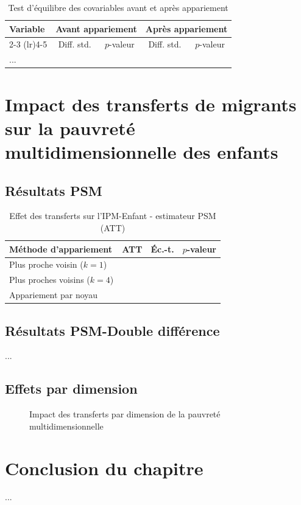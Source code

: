 \begin{table}[H]
  \centering
  \caption{Test d'équilibre des covariables avant et après appariement}
  \label{tab:balance}
  \begin{tabular}{lcccc}
    \toprule
    Variable & \multicolumn{2}{c}{Avant appariement} & \multicolumn{2}{c}{Après appariement} \\
    \cmidrule(lr){2-3} \cmidrule(lr){4-5}
             & Diff. std. & $p$-valeur & Diff. std. & $p$-valeur \\
    \midrule
    ... & & & & \\
    \bottomrule
  \end{tabular}
\end{table}

\section{Impact des transferts de migrants sur la pauvreté multidimensionnelle des enfants}

\subsection{Résultats PSM}

\begin{table}[H]
  \centering
  \caption{Effet des transferts sur l'IPM-Enfant - estimateur PSM (ATT)}
  \label{tab:psm_att}
  \begin{tabular}{lccc}
    \toprule
    Méthode d'appariement & ATT & Éc.-t. & $p$-valeur \\
    \midrule
    Plus proche voisin ($k=1$)  & & & \\
    Plus proches voisins ($k=4$) & & & \\
    Appariement par noyau        & & & \\
    \bottomrule
  \end{tabular}
\end{table}

\subsection{Résultats PSM-Double différence}

...

\subsection{Effets par dimension}

\begin{figure}[H]
  \centering
  \caption{Impact des transferts par dimension de la pauvreté multidimensionnelle}
  \label{fig:effets_dim}
\end{figure}

\section*{Conclusion du chapitre}

...
